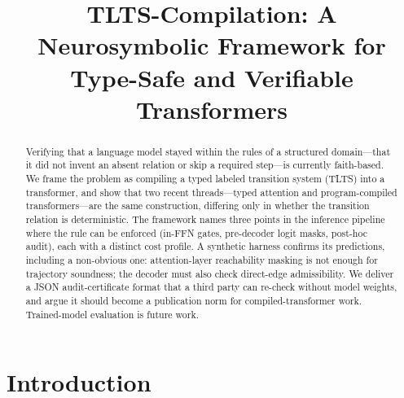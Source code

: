 \documentclass[preprint]{nesy2026}
\title[TLTS-Compilation]{TLTS-Compilation: A Neurosymbolic Framework
  for Type-Safe and Verifiable Transformers}
\begin{document}
\maketitle

\begin{center}
\end{center}

\begin{abstract}
Verifying that a language model stayed within the rules of a
structured domain---that it did not invent an absent relation or
skip a required step---is currently faith-based. We frame the problem
as compiling a typed labeled transition system (TLTS) into a
transformer, and show that two recent threads---typed attention and
program-compiled transformers---are the same construction, differing
only in whether the transition relation is deterministic. The
framework names three points in the inference pipeline where the
rule can be enforced (in-FFN gates, pre-decoder logit masks, post-hoc
audit), each with a distinct cost profile. A synthetic harness
confirms its predictions, including a non-obvious one:
attention-layer reachability masking is not enough for trajectory
soundness; the decoder must also check direct-edge admissibility. We
deliver a JSON audit-certificate format that a third party can
re-check without model weights, and argue it should become a
publication norm for compiled-transformer work. Trained-model
evaluation is future work.
\end{abstract}

\section{Introduction}
\label{sec:intro}
\end{document}
